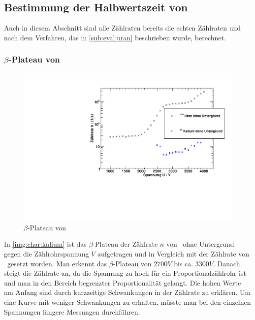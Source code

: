 \subsection{Bestimmung der Halbwertszeit von \kalium}
Auch in diesem Abschnitt sind alle Zählraten bereits die echten Zählraten und nach dem Verfahren, das in \ref{sub:eval:uran} beschrieben wurde, 
berechnet.
\subsubsection{$\beta$-Plateau von \kalium}
\begin{figure}[H]
\begin{center}
  \includegraphics[width=15cm]{../img/Kalium40_Charakteristik.pdf}
  \caption[$\beta$-Plateau mit \kalium]{$\beta$-Plateau von \kalium}
  \label{img:char:kalium}
\end{center}
\end{figure}
In \autoref{img:char:kalium} ist das $\beta$-Plateau der Zählrate $n$ von \kalium\, ohne Untergrund gegen die Zählrohrspannung $V$ aufgetragen 
und in Vergleich mit der Zählrate von \uran\, gesetzt worden. Man erkennt das $\beta$-Plateau von $2700V$ bis ca. $3300V$. Danach steigt die 
Zählrate an, da die Spannung zu hoch für ein Proportionalzählrohr ist und man in den Bereich begrenzter Proportionalität gelangt. Die hohen Werte 
am Anfang sind durch kurzzeitige Schwankungen in der Zählrate zu erklären. Um eine Kurve mit weniger Schwankungen zu erhalten, müsste man bei den 
einzelnen Spannungen längere Messungen durchführen.


